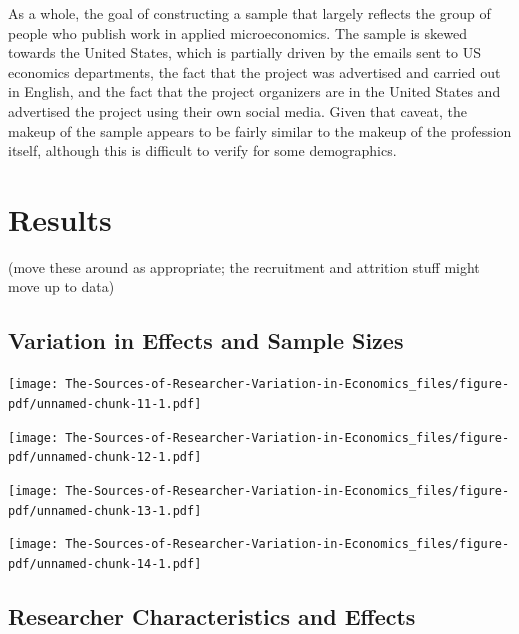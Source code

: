 \documentclass[
  letterpaper,
  DIV=11,
  numbers=noendperiod]{scrartcl}
\begin{document}
As a whole, the goal of constructing a sample that largely reflects the
group of people who publish work in applied microeconomics. The sample
is skewed towards the United States, which is partially driven by the
emails sent to US economics departments, the fact that the project was
advertised and carried out in English, and the fact that the project
organizers are in the United States and advertised the project using
their own social media. Given that caveat, the makeup of the sample
appears to be fairly similar to the makeup of the profession itself,
although this is difficult to verify for some demographics.

\hypertarget{results}{%
\section{Results}\label{results}}

(move these around as appropriate; the recruitment and attrition stuff
might move up to data)

\hypertarget{variation-in-effects-and-sample-sizes}{%
\subsection{Variation in Effects and Sample
Sizes}\label{variation-in-effects-and-sample-sizes}}

\texttt{[image: The-Sources-of-Researcher-Variation-in-Economics\_files/figure-pdf/unnamed-chunk-11-1.pdf]}

\texttt{[image: The-Sources-of-Researcher-Variation-in-Economics\_files/figure-pdf/unnamed-chunk-12-1.pdf]}

\texttt{[image: The-Sources-of-Researcher-Variation-in-Economics\_files/figure-pdf/unnamed-chunk-13-1.pdf]}

\texttt{[image: The-Sources-of-Researcher-Variation-in-Economics\_files/figure-pdf/unnamed-chunk-14-1.pdf]}


\hypertarget{researcher-characteristics-and-effects}{%
\subsection{Researcher Characteristics and
Effects}\label{researcher-characteristics-and-effects}}
\end{document}
